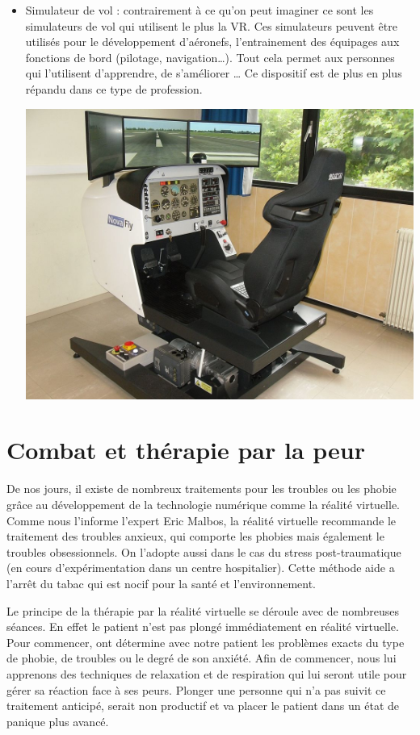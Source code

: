 \documentclass[12pt, a4paper]{report}
\begin{document}
\begin{itemize}
\item Simulateur de vol : contrairement à ce qu'on peut imaginer ce sont les simulateurs de vol qui utilisent le plus la VR.
Ces simulateurs peuvent être utilisés pour le développement d'aéronefs, l'entrainement des équipages aux fonctions de bord (pilotage, navigation\ldots{}). Tout cela permet aux personnes qui l'utilisent d'apprendre, de s'améliorer \ldots{} Ce dispositif est de plus en plus répandu dans ce type de profession.
\begin{center}
\includegraphics[scale=0.25]{conduite.jpg}
\end{center}
\end{itemize}
\section[Peur et réalité virtuelle]{Combat et thérapie par la peur}

De nos jours, il existe de nombreux traitements pour les troubles ou les phobie grâce au développement de la technologie numérique comme la réalité virtuelle.
Comme nous l'informe l'expert Eric Malbos,  la réalité virtuelle recommande le traitement des troubles anxieux, qui comporte les phobies mais également le troubles obsessionnels. On l'adopte aussi dans le cas du stress post-traumatique (en cours d'expérimentation dans un centre hospitalier). Cette méthode aide a l'arrêt du tabac qui est nocif pour la santé et l'environnement.

Le principe de la thérapie par la réalité virtuelle se déroule avec de nombreuses séances. En effet le patient n'est pas plongé immédiatement en réalité virtuelle. Pour commencer, ont détermine avec notre patient les problèmes exacts du type de phobie, de troubles ou le degré de son anxiété. Afin de commencer, nous lui apprenons des techniques de relaxation et de respiration qui lui seront utile pour gérer sa réaction face à ses peurs. Plonger une personne qui n'a pas suivit ce traitement anticipé, serait non productif et va placer le patient dans un état de panique plus avancé.
\end{document}
